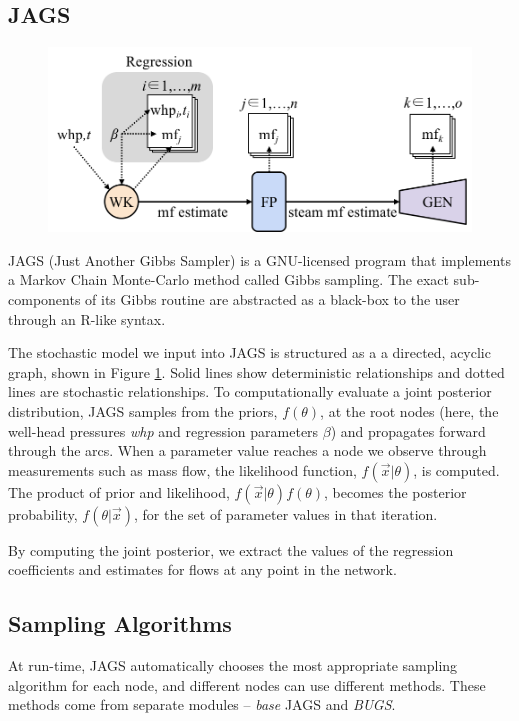 \documentclass[a4paper, 12pt]{article}
\begin{document}
\subsection{JAGS}

\begin{figure}
  \centering
  \includegraphics[width=0.5\linewidth]{media/jags_diagram}
  \label{fig:jags_diagram}
\end{figure}

JAGS (Just Another Gibbs Sampler) is a GNU-licensed program that implements a Markov Chain Monte-Carlo method called Gibbs sampling. The exact sub-components of its Gibbs routine are abstracted as a black-box to the user through an R-like syntax.

The stochastic model we input into JAGS is structured as a a directed, acyclic graph, shown in Figure \ref{fig:jags_diagram}. Solid lines show deterministic relationships and dotted lines are stochastic relationships. To computationally evaluate a joint posterior distribution, JAGS samples from the priors, $f(\theta)$, at the root nodes (here, the well-head pressures \emph{whp} and regression parameters $\beta$) and propagates forward through the arcs. When a parameter value reaches a node we observe through measurements such as mass flow, the likelihood function, $f(\vec{x}|\theta)$, is computed. The product of prior and likelihood, $f(\vec{x}|\theta)f(\theta)$, becomes the posterior probability, $f(\theta|\vec{x})$, for the set of parameter values in that iteration.

By computing the joint posterior, we extract the values of the regression coefficients and estimates for flows at any point in the network.

\subsection{Sampling Algorithms}
At run-time, JAGS automatically chooses the most appropriate sampling algorithm for each node, and different nodes can use different methods. These methods come from separate modules -- \emph{base} JAGS and \emph{BUGS}.
\end{document}
